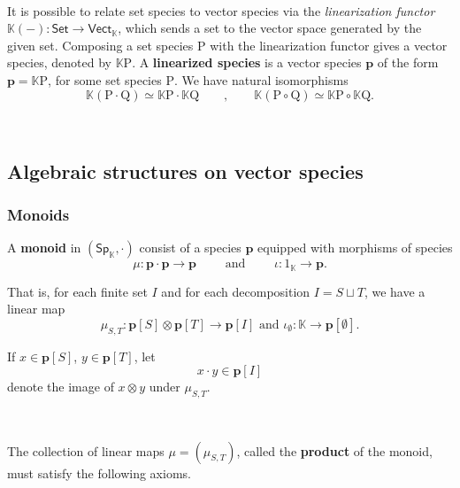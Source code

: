 \documentclass[12pt, reqno]{amsart}
\theoremstyle{definition}
\newcommand{\Vect}{\mathsf{Vect}}
\newcommand{\Set}{\mathsf{Set}}
\newcommand{\Ssk}{\mathsf{Sp}_\Kb} %
\newcommand{\Kb}{\mathbb{K}}
\newcommand{\rP}{\mathrm{P}}
\newcommand{\rQ}{\mathrm{Q}}
\newcommand{\tp}{\mathbf{p}}
\begin{document}
\

It is possible to relate set species to vector species via the \emph{linearization functor} $\mathbb{K}(-): \Set \to \Vect_{\mathbb{K}}$, which sends a set to the vector space generated by the given set. Composing a set species $\rP$ with the linearization functor gives a vector species, denoted by $\mathbb{K}\rP$. A {\bf linearized species} is a vector species $\tp$ of the form $\tp=\mathbb{K}\rP$, for some set species $\rP$. We have natural isomorphisms
 \[\mathbb{K}(\rP \cdot \rQ)\simeq \mathbb{K}\rP \cdot \mathbb{K}\rQ \qquad , \qquad \mathbb{K}(\rP \circ \rQ)\simeq \mathbb{K}\rP \circ \mathbb{K}\rQ.\]

\

\subsection{Algebraic structures on vector species}


\subsubsection{Monoids}
A {\bf monoid} in $(\Ssk, \cdot)$  consist of a species $\tp$ equipped with morphisms of species
\begin{equation*}
    \mu: \tp \cdot \tp \to \tp \qquad \text{ and } \qquad \iota: \mathrm{1}_{\mathbb{K}} \to \tp.
\end{equation*}

That is, for each finite set $I$ and for each decomposition $I=S \sqcup T$, we have a linear map 
\begin{equation*}
    \mu_{S,T}: \tp[S] \otimes \tp[T]\to \tp[I] \text{ and } \iota_\emptyset: \mathbb{K} \to \tp[\emptyset].
\end{equation*}

If $x \in \tp[S]$, $y \in \tp[T]$,  let 
\[x \cdot y \in \tp[I]\]
denote the image of $x\otimes y$ under $\mu_{S,T}$. 

\

The collection of linear maps $\mu=(\mu_{S,T})$, called the {\bf product} of the monoid, must satisfy the following axioms.

\
\end{document}
